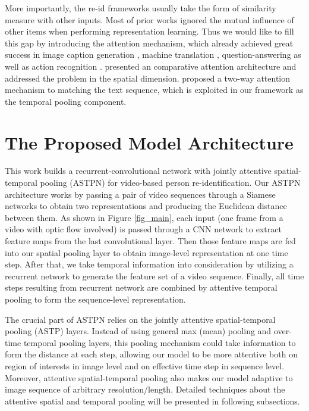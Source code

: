\documentclass[10pt,twocolumn,letterpaper]{article}
\begin{document}
More importantly, the re-id frameworks usually take the form of similarity measure with other inputs. Most of prior works ignored the mutual influence of other items when performing representation learning. Thus we would like to fill this gap by introducing the attention mechanism, which already achieved great success in image caption generation \cite{DBLP:conf/icml/XuBKCCSZB15}, machine translation \cite{DBLP:journals/corr/BahdanauCB14}, question-answering \cite{DBLP:journals/tacl/YinSXZ16} as well as action recognition \cite{DBLP:journals/corr/SharmaKS15}. \cite{DBLP:journals/corr/LiuFQJY16} presented an comparative attention architecture and addressed the problem in the spatial dimension. \cite{Santos2016AttentivePN} proposed a two-way attention mechanism to matching the text sequence, which is exploited in our framework as the temporal pooling component. 

\section{The Proposed Model Architecture}

This work builds a recurrent-convolutional network with jointly attentive spatial-temporal pooling (ASTPN) for video-based person re-identification. Our ASTPN architecture works by passing a pair of video sequences through a Siamese networks to obtain two representations and producing the Euclidean distance between them. As shown in Figure \ref{fig_main}, each input (one frame from a video with optic flow involved) is passed through a CNN network to extract feature maps from the last convolutional layer. Then those feature maps are fed into our spatial pooling layer to obtain image-level representation at one time step. After that, we take temporal information into consideration by utilizing a recurrent network to generate the feature set of a video sequence. Finally, all time steps resulting from recurrent network are combined by attentive temporal pooling to form the sequence-level representation. 

The crucial part of ASTPN relies on the jointly attentive spatial-temporal pooling (ASTP) layers. Instead of using general max (mean) pooling and over-time temporal pooling layers, 
this pooling mechanism could take information  to form the distance at each step, allowing our model to be more attentive both on region of interests in image level and on effective time step in sequence level. Moreover, attentive spatial-temporal pooling also makes our model adaptive to image sequence of arbitrary resolution/length. Detailed techniques about the attentive spatial and temporal pooling will be presented in following subsections.
\end{document}
